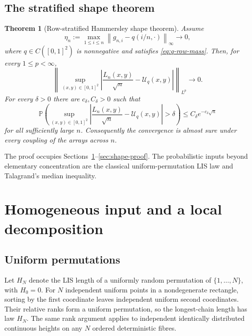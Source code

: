 \documentclass[11pt]{article}
\newtheorem{theorem}{Theorem}[section]
\theoremstyle{remark}
\newcommand{\Pp}{\mathbb P}
\newcommand{\calU}{\mathcal U}
\newcommand{\norm}[1]{\left\lVert #1\right\rVert}
\newcommand{\abs}[1]{\left|#1\right|}
\begin{document}
\subsection{The stratified shape theorem}

\begin{theorem}[Row-stratified Hammersley shape theorem]
\label{thm:stratified-shape}
Assume
\begin{equation}\label{eq:uniform-density-conv}
        \eta_n:=
        \max_{1\le i\le n}
        \norm{g_{n,i}-q(i/n,\cdot)}_\infty
        \longrightarrow0,
\end{equation}
where $q\in C([0,1]^2)$ is nonnegative and satisfies
\eqref{eq:q-row-mass}.  Then, for every $1\le p<\infty$,
\begin{equation}\label{eq:stratified-Lp}
 \norm{
 \sup_{(x,y)\in[0,1]^2}
 \abs{\frac{L_n(x,y)}{\sqrt n}-\calU_q(x,y)}
 }_{L^p}
 \longrightarrow0.
\end{equation}
For every $\delta>0$ there are $c_\delta,C_\delta>0$ such that
\begin{equation}\label{eq:stratified-exp}
 \Pp\left(
 \sup_{(x,y)\in[0,1]^2}
 \abs{\frac{L_n(x,y)}{\sqrt n}-\calU_q(x,y)}>\delta
 \right)
 \le C_\delta e^{-c_\delta\sqrt n}
\end{equation}
for all sufficiently large $n$.  Consequently the convergence is almost sure
under every coupling of the arrays across $n$.
\end{theorem}

The proof occupies Sections~\ref{sec:homogeneous-input}--\ref{sec:shape-proof}.
The probabilistic inputs beyond elementary concentration are the classical
uniform-permutation LIS law and Talagrand's median inequality.

\section{Homogeneous input and a local decomposition}
\label{sec:homogeneous-input}

\subsection{Uniform permutations}

Let $H_N$ denote the LIS length of a uniformly random permutation of
$\{1,\dots,N\}$, with $H_0=0$.
For $N$ independent uniform points in a nondegenerate rectangle, sorting by
the first coordinate leaves independent uniform second coordinates.  Their
relative ranks form a uniform permutation, so the longest-chain length has
law $H_N$.  The same rank argument applies to independent identically
distributed continuous heights on any $N$ ordered deterministic fibres.
\end{document}
